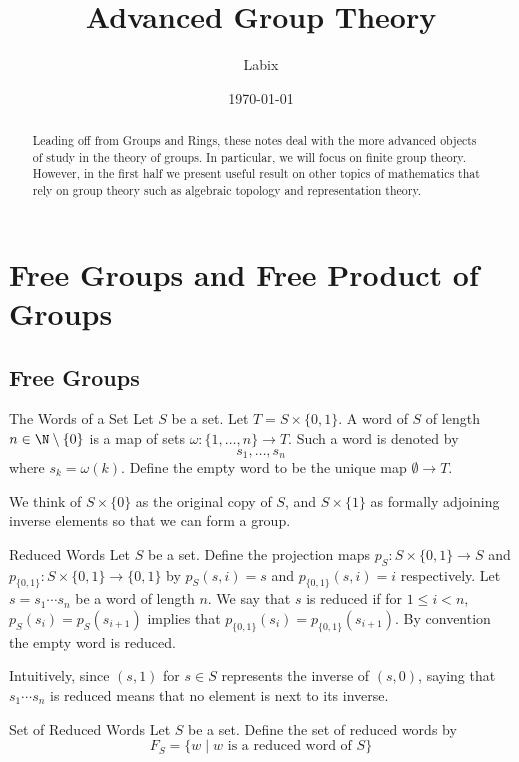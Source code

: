 \documentclass[a4paper]{article}
\title{Advanced Group Theory}
\author{Labix}
\date{\today}
\begin{document}
\maketitle
\begin{abstract}
Leading off from Groups and Rings, these notes deal with the more advanced objects of study in the theory of groups. In particular, we will focus on finite group theory. However, in the first half we present useful result on other topics of mathematics that rely on group theory such as algebraic topology and representation theory. 
\end{abstract}
\pagebreak
\tableofcontents
\pagebreak

\section{Free Groups and Free Product of Groups}
\subsection{Free Groups}
\begin{defn}{The Words of a Set}{} Let $S$ be a set. Let $T=S\times\{0,1\}$. A word of $S$ of length $n\in\N\setminus\{0\}$ is a map of sets $\omega:\{1,\dots,n\}\to T$. Such a word is denoted by $$s_1,\dots,s_n$$ where $s_k=\omega(k)$. Define the empty word to be the unique map $\emptyset\to T$. 
\end{defn}

We think of $S\times\{0\}$ as the original copy of $S$, and $S\times\{1\}$ as formally adjoining inverse elements so that we can form a group. 

\begin{defn}{Reduced Words}{} Let $S$ be a set. Define the projection maps $p_S:S\times\{0,1\}\to S$ and $p_{\{0,1\}}:S\times\{0,1\}\to\{0,1\}$ by $p_S(s,i)=s$ and $p_{\{0,1\}}(s,i)=i$ respectively. Let $s=s_1\cdots s_n$ be a word of length $n$. We say that $s$ is reduced if for $1\leq i<n$, $p_S(s_i)=p_S(s_{i+1})$ implies that $p_{\{0,1\}}(s_i)=p_{\{0,1\}}(s_{i+1})$. By convention the empty word is reduced. 
\end{defn}

Intuitively, since $(s,1)$ for $s\in S$ represents the inverse of $(s,0)$, saying that $s_1\cdots s_n$ is reduced means that no element is next to its inverse. 

\begin{defn}{Set of Reduced Words}{} Let $S$ be a set. Define the set of reduced words by $$F_S=\{w\;|\;w\text{ is a reduced word of }S\}$$
\end{defn}
\end{document}
